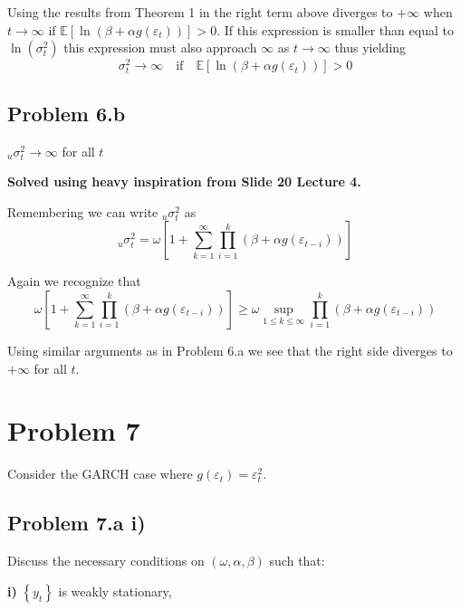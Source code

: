 \documentclass{EconHomework}
\begin{document}
Using the results from Theorem 1 in \cite{nelson1990}
the right term above diverges to $+\infty$ when $t\rightarrow\infty$
if $\mathbb{E}\left[\ln\left(\beta+\alpha g\left(\varepsilon_{t}\right)\right)\right]>0$.
If this expression is smaller than equal to $\ln\left(\sigma_{t}^{2}\right)$
this expression must also approach $\infty$ as $t\rightarrow\infty$
thus yielding
\[
\sigma_{t}^{2}\rightarrow\infty\quad\text{if}\quad\mathbb{E}\left[\ln\left(\beta+\alpha g\left(\varepsilon_{t}\right)\right)\right]>0
\]



\subsection{Problem 6.b}
\begin{tcolorbox}[colback=white]
$_{u}\sigma_{t}^{2}\rightarrow\infty$ for all $t$
\end{tcolorbox}

\textbf{Solved using heavy inspiration from Slide 20 Lecture 4.}

\bigskip

Remembering we can write $_{u}\sigma_{t}^{2}$ as 
\[
_{u}\sigma_{t}^{2}=\omega\left[1+\sum_{k=1}^{\infty}\prod_{i=1}^{k}\left(\beta+\alpha g\left(\varepsilon_{t-i}\right)\right)\right]
\]

Again we recognize that
\[
\omega\left[1+\sum_{k=1}^{\infty}\prod_{i=1}^{k}\left(\beta+\alpha g\left(\varepsilon_{t-i}\right)\right)\right]\geq\omega\sup_{1\leq k\leq\infty}\prod_{i=1}^{k}\left(\beta+\alpha g\left(\varepsilon_{t-i}\right)\right)
\]

Using similar arguments as in Problem 6.a we see that the right
side diverges to $+\infty$ for all $t$.




\section{Problem 7}
Consider the GARCH case where $g\left(\varepsilon_{t}\right)=\varepsilon_{t}^{2}$.

\subsection{Problem 7.a i)}
\begin{tcolorbox}[colback=white]
    Discuss the necessary conditions on $(\omega, \alpha, \beta)$ such that: 
    
    \textbf{i)} $\left\{y_{t}\right\}$ is weakly stationary,
\end{tcolorbox}
\end{document}
